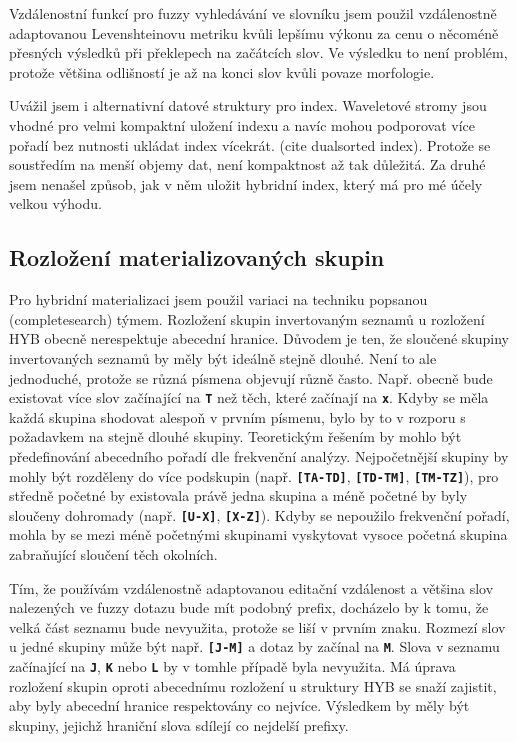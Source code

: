 \documentclass[11pt,letterpaper,oneside,openright]{book}
\newcommand{\bftt}[1]{\texttt{\textbf{#1}}}
\begin{document}
Vzdálenostní funkcí pro fuzzy vyhledávání ve slovníku jsem použil vzdálenostně
adaptovanou Levenshteinovu metriku kvůli lepšímu výkonu za cenu o něcoméně
přesných výsledků při překlepech na začátcích slov. Ve výsledku to není
problém, protože většina odlišností je až na konci slov kvůli povaze
morfologie.

Uvážil jsem i alternativní datové struktury pro index. Waveletové stromy jsou
vhodné pro velmi kompaktní uložení indexu a navíc mohou podporovat více pořadí
bez nutnosti ukládat index vícekrát. (cite dualsorted index). Protože se
soustředím na menší objemy dat, není kompaktnost až tak důležitá. Za druhé jsem
nenašel způsob, jak v něm uložit hybridní index, který má pro mé účely velkou
výhodu.

\subsection{Rozložení materializovaných skupin}
Pro hybridní materializaci jsem použil variaci na techniku popsanou
(completesearch) týmem. Rozložení skupin invertovaným seznamů u rozložení HYB
obecně nerespektuje abecední hranice. Důvodem je ten, že sloučené skupiny
invertovaných seznamů by měly být ideálně stejně dlouhé. Není to ale
jednoduché, protože se různá písmena objevují různě často. Např. obecně bude
existovat více slov začínající na \bftt{T} než těch, které začínají na
\bftt{x}. Kdyby se měla každá skupina shodovat alespoň v prvním písmenu, bylo
by to v rozporu s požadavkem na stejně dlouhé skupiny. Teoretickým řešením by
mohlo být předefinování abecedního pořadí dle frekvenční analýzy. Nejpočetnější
skupiny by mohly být rozděleny do více podskupin (např. \bftt{[TA-TD]},
\bftt{[TD-TM]}, \bftt{[TM-TZ]}), pro středně početné by existovala právě jedna
skupina a méně početné by byly sloučeny dohromady (např. \bftt{[U-X]},
\bftt{[X-Z]}). Kdyby se nepoužilo frekvenční pořadí, mohla by se mezi méně
početnými skupinami vyskytovat vysoce početná skupina zabraňující sloučení těch
okolních.

Tím, že používám vzdálenostně adaptovanou editační vzdálenost a většina slov
nalezených ve fuzzy dotazu bude mít podobný prefix, docházelo by k tomu, že
velká část seznamu bude nevyužita, protože se liší v prvním znaku. Rozmezí slov
u jedné skupiny může být např. \bftt{[J-M]} a dotaz by začínal na \bftt{M}. Slova v
seznamu začínající na \bftt{J}, \bftt{K} nebo \bftt{L} by v tomhle případě byla
nevyužita. Má úprava rozložení skupin oproti abecednímu rozložení u struktury
HYB se snaží zajistit, aby byly abecední hranice respektovány co nejvíce.
Výsledkem by měly být skupiny, jejichž hraniční slova sdílejí co nejdelší
prefixy.
\end{document}

